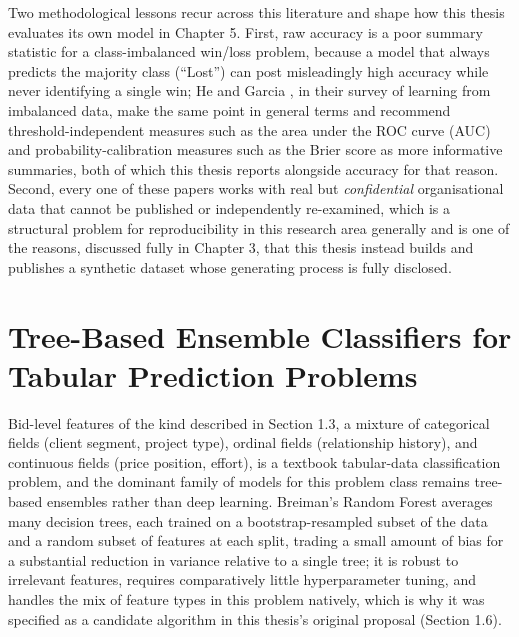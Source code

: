 \documentclass[12pt,oneside]{report}
\begin{document}
Two methodological lessons recur across this literature and shape how
this thesis evaluates its own model in Chapter 5. First, raw accuracy is
a poor summary statistic for a class-imbalanced win/loss problem,
because a model that always predicts the majority class (``Lost'') can
post misleadingly high accuracy while never identifying a single win; He
and Garcia \citep{he2009learning}, in their survey of learning from
imbalanced data, make the same point in general terms and recommend
threshold-independent measures such as the area under the ROC curve
(AUC) and probability-calibration measures such as the Brier score as
more informative summaries, both of which this thesis reports alongside
accuracy for that reason. Second, every one of these papers works with
real but \emph{confidential} organisational data that cannot be
published or independently re-examined, which is a structural problem
for reproducibility in this research area generally and is one of the
reasons, discussed fully in Chapter 3, that this thesis instead builds
and publishes a synthetic dataset whose generating process is fully
disclosed.

\hypertarget{tree-based-ensemble-classifiers-for-tabular-prediction-problems}{%
\section{Tree-Based Ensemble Classifiers for Tabular Prediction
Problems}\label{tree-based-ensemble-classifiers-for-tabular-prediction-problems}}

Bid-level features of the kind described in Section 1.3, a mixture of
categorical fields (client segment, project type), ordinal fields
(relationship history), and continuous fields (price position, effort),
is a textbook tabular-data classification problem, and the dominant
family of models for this problem class remains tree-based ensembles
rather than deep learning. Breiman's Random Forest
\citep{breiman2001random} averages many decision trees, each trained on
a bootstrap-resampled subset of the data and a random subset of features
at each split, trading a small amount of bias for a substantial
reduction in variance relative to a single tree; it is robust to
irrelevant features, requires comparatively little hyperparameter
tuning, and handles the mix of feature types in this problem natively,
which is why it was specified as a candidate algorithm in this thesis's
original proposal (Section 1.6).
\end{document}

